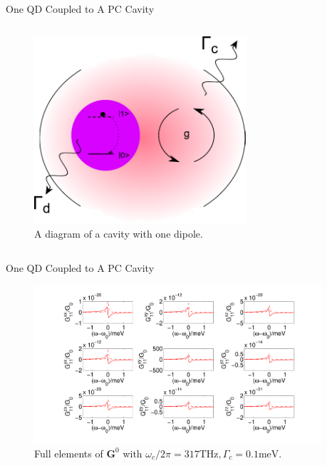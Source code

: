\documentclass{beamer}
\begin{document}
\begin{frame}{One QD Coupled to A PC Cavity}
\begin{columns}
\begin{figure}[htp]%
  \centering
 \begin{center}
 \includegraphics[width=0.7\textwidth]{./Figs/Cavity_withDipoleT}%
 \end{center}
 \caption[A diagram of a cavity with one dipole.]{A diagram of a cavity with one dipole. }
 \label{Cavity_withDipoleT}
 \end{figure}

\end{columns}
\end{frame}

\begin{frame}{One QD Coupled to A PC Cavity}
\begin{figure}[H]
\centering
\begin{center}
\includegraphics[width=0.95\textwidth]{./Figs/G84_11_1}
\end{center}
\caption[Diagram of GFT tensor elements.]{Full elements of $\mathbf{G}^0$ with $\omega_c/2\pi = 317 {\text {THz}}, \Gamma_c = 0.1 {\text {meV}}$.}
\label{G84_11_1}
\end{figure}
\end{frame}
\end{document}
